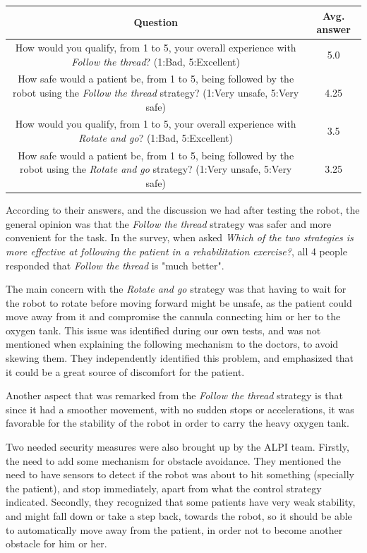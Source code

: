 \documentclass[journal]{IEEEtran}
\begin{document}
\begin{table}[t]
\begin{center}
\begin{tabular}[!t]{|c|c|}
\hline
Question & Avg. answer \\
\hline
How would you qualify, from 1 to 5, your overall experience with \textit{Follow the thread}? (1:Bad, 5:Excellent)  & 5.0\\
\hline
How safe would a patient be, from 1 to 5, being followed by the robot using the \textit{Follow the thread} strategy? (1:Very unsafe, 5:Very safe)  & 4.25\\
\hline
How would you qualify, from 1 to 5, your overall experience with \textit{Rotate and go}? (1:Bad, 5:Excellent)  & 3.5\\
\hline
How safe would a patient be, from 1 to 5, being followed by the robot using the \textit{Rotate and go} strategy? (1:Very unsafe, 5:Very safe) & 3.25\\
\hline
\end{tabular}
\label{tab:alpi_q_table_1}
\end{center}
\end{table}

According to their answers, and the discussion we had after testing the robot, the general opinion was that the \textit{Follow the thread} strategy was safer and more convenient for the task. In the survey, when asked \textit{Which of the two strategies is more effective at following the patient in a rehabilitation exercise?}, all 4 people responded that \textit{Follow the thread} is "much better".

The main concern with the \textit{Rotate and go} strategy was that having to wait for the robot to rotate before moving forward might be unsafe, as the patient could move away from it and compromise the cannula connecting him or her to the oxygen tank. This issue was identified during our own tests, and was not mentioned when explaining the following mechanism to the doctors, to avoid skewing them. They independently identified this problem, and emphasized that it could be a great source of discomfort for the patient.

Another aspect that was remarked from the \textit{Follow the thread} strategy is that since it had a smoother movement, with no sudden stops or accelerations, it was favorable for the stability of the robot in order to carry the heavy oxygen tank.

Two needed security measures were also brought up by the ALPI team. Firstly, the need to add some mechanism for obstacle avoidance. They mentioned the need to have sensors to detect if the robot was about to hit something (specially the patient), and stop immediately, apart from what the control strategy indicated. Secondly, they recognized that some patients have very weak stability, and might fall down or take a step back, towards the robot, so it should be able to automatically move away from the patient, in order not to become another obstacle for him or her. 
\end{document}
